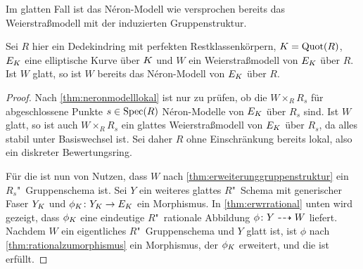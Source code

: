 Im glatten Fall ist das Néron-Modell wie versprochen bereits das
Weierstraßmodell mit der induzierten Gruppenstruktur.
\begin{Satz}\label{thm:neronmausweierstrassgl}
  Sei $R$ hier ein Dedekindring mit perfekten Restklassenkörpern,
  ${K=\operatorname{Quot}(R)}$,
  $E_{K}$ eine elliptische Kurve über $K$ und
  $W$ ein Weierstraßmodell von $E_{K}$ über $R$.
  Ist $W$ glatt, so ist $W$ bereits das Néron-Modell von $E_{K}$ über
  $R$.
  \begin{proof}
    Nach \ref{thm:neronmodelllokal} ist nur zu prüfen, ob die 
    $W\times_R R_s$ für abgeschlossene Punkte $s\in\operatorname{Spec}(R)$
    Néron-Modelle von $E_{K}$ über $R_s$ sind.
    Ist $W$ glatt, so ist auch $W\times_R R_s$ ein glattes
    Weierstraßmodell von $E_{K}$ über $R_s$, da alles stabil unter
    Basiswechsel ist.
    Sei daher $R$ ohne Einschränkung bereits lokal, also ein diskreter
    Bewertungsring.

    Für die \NAbbEig ist nun von Nutzen, dass $W$ nach
    \ref{thm:erweiterunggruppenstruktur} ein $R_s$"~Gruppenschema ist.
    Sei $Y$ ein weiteres glattes $R$"~Schema mit generischer Faser
    $Y_{K}$ und ${\phi_{K}\colon Y_{K}\to E_{K}}$ ein Morphismus.
    In \ref{thm:erwrrational} unten wird gezeigt, dass $\phi_{K}$ eine
    eindeutige $R$"~rationale Abbildung ${\phi\colon Y\dashrightarrow W}$ liefert.
    Nachdem $W$ ein eigentliches $R$"~Gruppenschema und $Y$ glatt ist,
    ist $\phi$ nach \ref{thm:rationalzumorphismus} ein Morphismus, der
    $\phi_{K}$ erweitert, und die \NAbbEig ist erfüllt.
  \end{proof}
\end{Satz}

